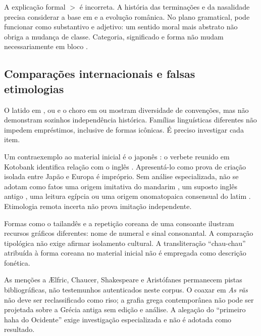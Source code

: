 A explicação formal  $>$  é incorreta. A história das terminações e da nasalidade precisa considerar a base em  e a evolução românica. No plano gramatical,  pode funcionar como substantivo e adjetivo: um sentido moral mais abstrato não obriga a mudança de classe. Categoria, significado e forma não mudam necessariamente em bloco \cite{ilari2018,campbell2021}.

\subsection{Comparações internacionais e falsas etimologias}
O latido em ,  ou  e o choro em  ou  mostram diversidade de convenções, mas não demonstram sozinhos independência histórica. Famílias linguísticas diferentes não impedem empréstimos, inclusive de formas icônicas. É preciso investigar cada item.

Um contraexemplo ao material inicial é o japonês : o verbete reunido em Kotobank identifica relação com o inglês  \cite{kotobank}. Apresentá-lo como prova de criação isolada entre Japão e Europa é impróprio. Sem análise especializada, não se adotam como fatos uma origem imitativa do mandarim , um suposto inglês antigo , uma leitura egípcia  ou uma origem onomatopaica consensual do latim . Etimologia remota incerta não prova imitação independente.

Formas como o tailandês  e a repetição coreana de uma consoante ilustram recursos gráficos diferentes: nome de numeral e sinal consonantal. A comparação tipológica não exige afirmar isolamento cultural. A transliteração ``chau-chau'' atribuída à forma coreana no material inicial não é empregada como descrição fonética.

As menções a Ælfric, Chaucer, Shakespeare e Aristófanes permanecem pistas bibliográficas, não testemunhos autenticados neste corpus. O coaxar em \textit{As rãs} não deve ser reclassificado como riso; a grafia grega contemporânea não pode ser projetada sobre a Grécia antiga sem edição e análise. A alegação do ``primeiro haha do Ocidente'' exige investigação especializada e não é adotada como resultado.
